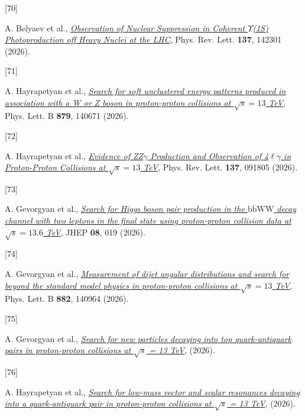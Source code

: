\documentclass[
]{article}
\newlength{\cslhangindent}
\newlength{\csllabelwidth}
\newenvironment{CSLReferences}[2] %
 {\begin{list}{}{%
  \setlength{\itemindent}{0pt}
  \setlength{\leftmargin}{0pt}
  \setlength{\parsep}{0pt}
  \ifodd #1
   \setlength{\leftmargin}{\cslhangindent}
   \setlength{\itemindent}{-1\cslhangindent}
  \fi
  \setlength{\itemsep}{#2\baselineskip}}}
 {\end{list}}
\newcommand{\CSLLeftMargin}[1]{\parbox[t]{\csllabelwidth}{\strut#1\strut}}
\newcommand{\CSLRightInline}[1]{\parbox[t]{\linewidth - \csllabelwidth}{\strut#1\strut}}
\let\oldUpsilon\Upsilon
\renewcommand{\Upsilon}{\ensuremath{\oldUpsilon}}
\begin{document}
\begin{CSLReferences}{0}{0}
\CSLLeftMargin{{[}70{]} }%
\CSLRightInline{A. Belyaev et al.,
\emph{\href{https://doi.org/10.1103/ll3f-l5xv}{{Observation of Nuclear
Suppression in Coherent {\(\Upsilon\)}(1S) Photoproduction off Heavy
Nuclei at the LHC}}}, Phys. Rev. Lett. \textbf{137}, 142301 (2026).}

\CSLLeftMargin{{[}71{]} }%
\CSLRightInline{A. Hayrapetyan et al.,
\emph{\href{https://doi.org/10.1016/j.physletb.2026.140671}{{Search for
soft unclustered energy patterns produced in association with a W or Z
boson in proton-proton collisions at \(\sqrt{s}=13\) TeV}}}, Phys. Lett.
B \textbf{879}, 140671 (2026).}

\CSLLeftMargin{{[}72{]} }%
\CSLRightInline{A. Hayrapetyan et al.,
\emph{\href{https://doi.org/10.1103/gdbv-wnpp}{{Evidence of
ZZ{\(\gamma\)} Production and Observation of 4{\(\ell\)}{\(\gamma\)} in
Proton-Proton Collisions at \(\sqrt{s}=13\) TeV}}}, Phys. Rev. Lett.
\textbf{137}, 091805 (2026).}

\CSLLeftMargin{{[}73{]} }%
\CSLRightInline{A. Gevorgyan et al.,
\emph{\href{https://doi.org/10.1007/JHEP08(2026)019}{{Search for Higgs
boson pair production in the
\(\mathrm{b}\overline{\mathrm{b}}\mathrm{WW}\) decay channel with two
leptons in the final state using proton-proton collision data at
\(\sqrt{s}=13.6\) TeV}}}, JHEP \textbf{08}, 019 (2026).}

\CSLLeftMargin{{[}74{]} }%
\CSLRightInline{A. Gevorgyan et al.,
\emph{\href{https://doi.org/10.1016/j.physletb.2026.140964}{{Measurement
of dijet angular distributions and search for beyond the standard model
physics in proton-proton collisions at \(\sqrt{s}=13\) TeV}}}, Phys.
Lett. B \textbf{882}, 140964 (2026).}

\CSLLeftMargin{{[}75{]} }%
\CSLRightInline{A. Gevorgyan et al.,
\emph{\href{https://arxiv.org/abs/2603.23454}{{Search for new particles
decaying into top quark-antiquark pairs in proton-proton collisions at
\(\sqrt{s}\) = 13 TeV}}}, (2026).}

\CSLLeftMargin{{[}76{]} }%
\CSLRightInline{A. Hayrapetyan et al.,
\emph{\href{https://arxiv.org/abs/2603.21965}{{Search for low-mass
vector and scalar resonances decaying into a quark-antiquark pair in
proton-proton collisions at \(\sqrt{s}\) = 13 TeV}}}, (2026).}


\end{CSLReferences}
\end{document}
